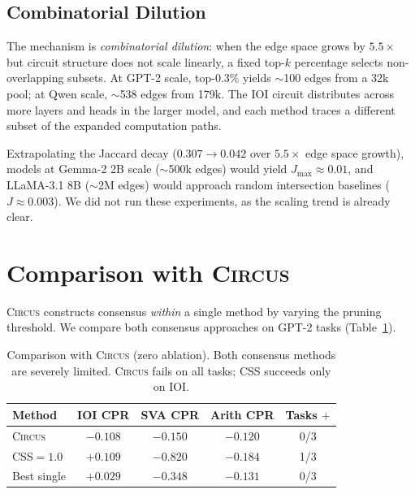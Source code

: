 \documentclass[11pt,a4paper]{article}
\newcommand{\css}{\textsc{CSS}}
\newcommand{\circus}{\textsc{Circus}}
\begin{document}
\subsection{Combinatorial Dilution}

The mechanism is \emph{combinatorial dilution}: when the edge space grows by $5.5\times$ but circuit structure does not scale linearly, a fixed top-$k$ percentage selects non-overlapping subsets.
At GPT-2 scale, top-0.3\% yields $\sim$100 edges from a 32k pool; at Qwen scale, $\sim$538 edges from 179k.
The IOI circuit distributes across more layers and heads in the larger model, and each method traces a different subset of the expanded computation paths.

Extrapolating the Jaccard decay ($0.307 \to 0.042$ over $5.5\times$ edge space growth), models at Gemma-2 2B scale ($\sim$500k edges) would yield $J_{\max} \approx 0.01$, and LLaMA-3.1 8B ($\sim$2M edges) would approach random intersection baselines ($J \approx 0.003$).
We did not run these experiments, as the scaling trend is already clear.

\section{Comparison with \circus{}}
\label{sec:circus}

\circus{} \citep{parekh2026circus} constructs consensus \emph{within} a single method by varying the pruning threshold.
We compare both consensus approaches on GPT-2 tasks (Table~\ref{tab:circus}).

\begin{table}[t]
\centering
\small
\begin{tabular}{lcccc}
\toprule
\textbf{Method} & \textbf{IOI CPR} & \textbf{SVA CPR} & \textbf{Arith CPR} & \textbf{Tasks $+$} \\
\midrule
\circus{}      & $-0.108$ & $-0.150$ & $-0.120$ & 0/3 \\
\css{}$= 1.0$  & $+0.109$ & $-0.820$ & $-0.184$ & 1/3 \\
Best single    & $+0.029$ & $-0.348$ & $-0.131$ & 0/3 \\
\bottomrule
\end{tabular}
\caption{Comparison with \circus{} (zero ablation). Both consensus methods are severely limited. \circus{} fails on all tasks; \css{} succeeds only on IOI.}
\label{tab:circus}
\end{table}
\end{document}
